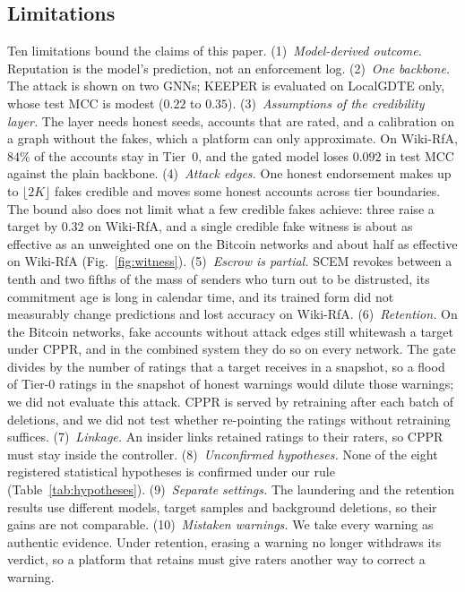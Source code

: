 \documentclass[lettersize,journal]{IEEEtran}
\begin{document}
\subsection{Limitations}
\label{subsec:limitations}

Ten limitations bound the claims of this paper.
(1)~\emph{Model-derived outcome.} Reputation is the model's prediction, not an enforcement log.
(2)~\emph{One backbone.} The attack is shown on two GNNs; KEEPER is evaluated on LocalGDTE only, whose test MCC is modest ($0.22$ to $0.35$).
(3)~\emph{Assumptions of the credibility layer.} The layer needs honest seeds, accounts that are rated, and a calibration on a graph without the fakes, which a platform can only approximate. On Wiki-RfA, $84\%$ of the accounts stay in Tier~$0$, and the gated model loses $0.092$ in test MCC against the plain backbone.
(4)~\emph{Attack edges.} One honest endorsement makes up to $\lfloor 2K \rfloor$ fakes credible and moves some honest accounts across tier boundaries. The bound also does not limit what a few credible fakes achieve: three raise a target by $0.32$ on Wiki-RfA, and a single credible fake witness is about as effective as an unweighted one on the Bitcoin networks and about half as effective on Wiki-RfA (Fig.~\ref{fig:witness}).
(5)~\emph{Escrow is partial.} SCEM revokes between a tenth and two fifths of the mass of senders who turn out to be distrusted, its commitment age is long in calendar time, and its trained form did not measurably change predictions and lost accuracy on Wiki-RfA.
(6)~\emph{Retention.} On the Bitcoin networks, fake accounts without attack edges still whitewash a target under CPPR, and in the combined system they do so on every network. The gate divides by the number of ratings that a target receives in a snapshot, so a flood of Tier-$0$ ratings in the snapshot of honest warnings would dilute those warnings; we did not evaluate this attack. CPPR is served by retraining after each batch of deletions, and we did not test whether re-pointing the ratings without retraining suffices.
(7)~\emph{Linkage.} An insider links retained ratings to their raters, so CPPR must stay inside the controller.
(8)~\emph{Unconfirmed hypotheses.} None of the eight registered statistical hypotheses is confirmed under our rule (Table~\ref{tab:hypotheses}).
(9)~\emph{Separate settings.} The laundering and the retention results use different models, target samples and background deletions, so their gains are not comparable.
(10)~\emph{Mistaken warnings.} We take every warning as authentic evidence. Under retention, erasing a warning no longer withdraws its verdict, so a platform that retains must give raters another way to correct a warning.
\end{document}
